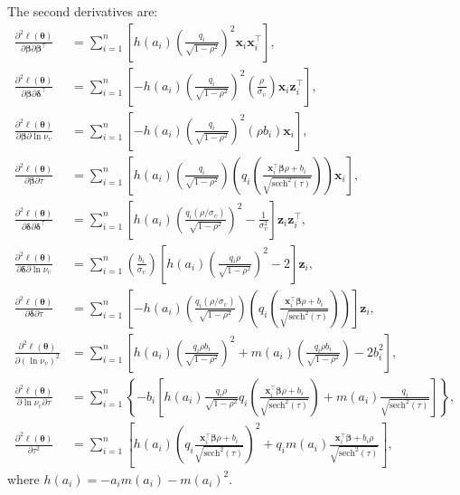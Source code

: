 The second derivatives are:
\begin{equation*}
\begin{aligned}
\frac{\partial^2 \ell(\boldsymbol \theta)}{\partial \boldsymbol \beta\partial \boldsymbol \beta^\top} & = \sum_{i = 1}^n\left[h(a_i)\left(\frac{q_i}{\sqrt{1-\rho^2}}\right)^2\mathbf x_i\mathbf x_i^\top\right],  \\
\frac{\partial^2 \ell(\boldsymbol \theta)}{\partial \boldsymbol \beta\partial \boldsymbol \delta^\top} & =\sum_{i = 1}^n\left[-h(a_i)\left(\frac{q_i}{\sqrt{1-\rho^2}}\right)^2\left(\frac{\rho}{\sigma_{\upsilon}}\right)\mathbf x_i\mathbf z_i^\top\right],  \\
\frac{\partial^2 \ell(\boldsymbol \theta)}{\partial \boldsymbol \beta\partial \ln \nu_{\upsilon}} & =\sum_{i = 1}^n\left[-h(a_i)\left(\frac{q_i}{\sqrt{1-\rho^2}}\right)^2\left(\rho b_i\right)\mathbf x_i\right],  \\
\frac{\partial^2 \ell(\boldsymbol \theta)}{\partial \boldsymbol \beta\partial \tau} & =\sum_{i = 1}^n\left[h(a_i)\left(\frac{q_i}{\sqrt{1-\rho^2}}\right)\left(q_i\left(\frac{\mathbf x_i^\top\boldsymbol \beta\rho +b_i}{\sqrt{\text{sech}^2(\tau)}}\right)\right)\mathbf x_i\right], \\
  \frac{\partial^2 \ell(\boldsymbol \theta)}{\partial \boldsymbol \delta\partial \boldsymbol \delta^\top} & = \sum_{i = 1}^n\left[h(a_i)\left(\frac{q_i\left(\rho/\sigma_{\upsilon}\right)}{\sqrt{1-\rho^2}}\right)^2-\frac{1}{\sigma^2_{\upsilon}}\right]\mathbf z_i\mathbf z_i^\top, \\
  \frac{\partial^2 \ell(\boldsymbol \theta)}{\partial \boldsymbol \delta\partial \ln \nu_{\upsilon}} & =\sum_{i = 1}^n\left(\frac{b_i}{\sigma_{\upsilon}}\right)\left[h(a_i)\left(\frac{q_i\rho}{\sqrt{1-\rho^2}}\right)^2-2\right]\mathbf z_i, \\
    \frac{\partial^2 \ell(\boldsymbol \theta)}{\partial \boldsymbol \delta\partial \tau} & =\sum_{i = 1}^n\left[-h(a_i)\left(\frac{q_i\left(\rho/\sigma_{\upsilon}\right)}{\sqrt{1-\rho^2}}\right)\left(q_i\left(\frac{\mathbf x_i^\top\boldsymbol \beta\rho +b_i}{\sqrt{\text{sech}^2(\tau)}}\right)\right)\right]\mathbf z_i, \\
\frac{\partial^2 \ell(\boldsymbol \theta)}{\partial (\ln \nu_{\upsilon})^2}& = \sum_{i = 1}^n\left[h(a_i)\left(\frac{q_i\rho b_i}{\sqrt{1-\rho^2}}\right)^2+m(a_i)\left(\frac{q_i\rho b_i}{\sqrt{1-\rho^2}}\right)-2b_i^2\right], \\
\frac{\partial^2 \ell(\boldsymbol \theta)}{\partial \ln \nu_{\upsilon} \partial \tau} & = \sum_{i = 1}^n\left\lbrace-b_i\left[h(a_i)\frac{q_i\rho}{\sqrt{1-\rho^2}}q_i\left(\frac{\mathbf x_i^\top\boldsymbol \beta\rho +    b_i}{\sqrt{\text{sech}^2(\tau)}}\right)
+ m(a_i)\frac{q_i}{\sqrt{\text{sech}^2(\tau)}}
\right]\right\rbrace, \\
\frac{\partial^2 \ell(\boldsymbol \theta)}{\partial \tau^2} & = \sum_{i = 1}^n\left[h(a_i)\left(q_i\frac{\mathbf x_i^\top\boldsymbol \beta\rho +    b_i}{\sqrt{\text{sech}^2(\tau)}}\right)^2+q_i m(a_i)\frac{\mathbf x_i^\top\boldsymbol \beta+ b_i\rho}{\sqrt{\text{sech}^2(\tau)}}\right],
\end{aligned}
\end{equation*}
where \(h(a_i) = - a_i m(a_i)- m(a_i)^2\).

